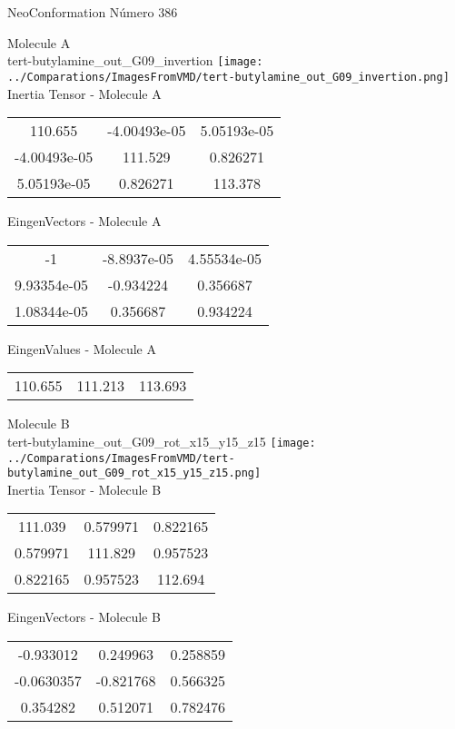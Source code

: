 \vtab[-2cm]
\begin{center}
{\large NeoConformation \tab Número 386}
\end{center}
\begin{multicols}{2}
\begin{center}

Molecule A \\ 
tert-butylamine\_out\_G09\_invertion
\texttt{[image: ../Comparations/ImagesFromVMD/tert-butylamine\_out\_G09\_invertion.png]}
\\
Inertia Tensor - Molecule A \\
\vtab

\begin{tabular}{|c c c|}
110.655	 & 	-4.00493e-05	 & 	5.05193e-05	 \\
-4.00493e-05	 & 	111.529	 & 	0.826271	 \\
5.05193e-05	 & 	0.826271	 & 	113.378
\end{tabular}

\vtab
 EingenVectors - Molecule A     \\
\vtab
\begin{tabular}{|c c c|}
-1	 & 	-8.8937e-05	 & 	4.55534e-05	 \\
9.93354e-05	 & 	-0.934224	 & 	0.356687	 \\
1.08344e-05	 & 	0.356687	 & 	0.934224
\end{tabular}

\vtab
 EingenValues - Molecule A     \\
\vtab
\begin{tabular}{|c c c|}
110.655	 & 	111.213	 & 	113.693	 \\
\end{tabular}
\columnbreak

Molecule B \\ 
tert-butylamine\_out\_G09\_rot\_x15\_y15\_z15
\texttt{[image: ../Comparations/ImagesFromVMD/tert-butylamine\_out\_G09\_rot\_x15\_y15\_z15.png]}
\\
Inertia Tensor - Molecule B \\
\vtab

\begin{tabular}{|c c c|}
111.039	 & 	0.579971	 & 	0.822165	 \\
0.579971	 & 	111.829	 & 	0.957523	 \\
0.822165	 & 	0.957523	 & 	112.694
\end{tabular}

\vtab
 EingenVectors - Molecule B     \\
\vtab
\begin{tabular}{|c c c|}
-0.933012	 & 	0.249963	 & 	0.258859	 \\
-0.0630357	 & 	-0.821768	 & 	0.566325	 \\
0.354282	 & 	0.512071	 & 	0.782476
\end{tabular}


\end{center}
\end{multicols}
